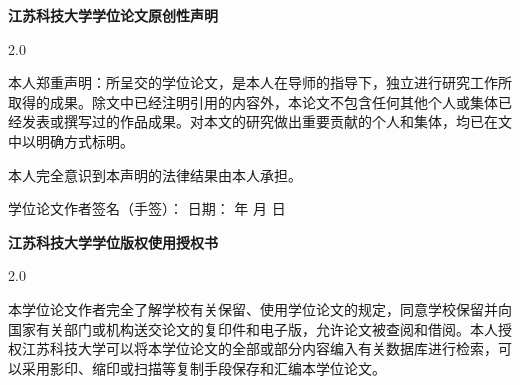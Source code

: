 {
    \vspace*{-2cm}
    \setlength{\parindent}{2em} %
    \vspace*{2cm}
    {
        {\centering \songti {} \bfseries 江苏科技大学学位论文原创性声明\par}    %
        \vspace{21pt}
        \begin{spacing}{2.0}
        {\songti {}本人郑重声明：所呈交的学位论文，是本人在导师的指导下，独立进行研究工作所取得的成果。除文中已经注明引用的内容外，本论文不包含任何其他个人或集体已经发表或撰写过的作品成果。对本文的研究做出重要贡献的个人和集体，均已在文中以明确方式标明。
		
		本人完全意识到本声明的法律结果由本人承担。}
        \end{spacing}
		
        \vspace{10pt}
        \vspace{10pt}
		\vspace{10pt}
        \vspace{10pt}
        \vspace{10pt}
		\vspace{10pt}
		\vspace{10pt}
        \vspace{10pt}
		\vspace{10pt}
        \begin{center}
            {\songti {}学位论文作者签名（手签）：\makebox[5em][c]{} \quad %
            日期：
            \makebox[3em][c]{} 年
            \makebox[1.5em][c]{} 月
            \makebox[1.5em][c]{} 日}
        \end{center}
    }
	
	
	\newpage
    \vspace{2.0cm}
    {
        {\centering \songti {} \bfseries 江苏科技大学学位版权使用授权书 \par}
        \vspace{21pt}
        \begin{spacing}{2.0}
        { \songti {}本学位论文作者完全了解学校有关保留、使用学位论文的规定，同意学校保留并向国家有关部门或机构送交论文的复印件和电子版，允许论文被查阅和借阅。本人授权江苏科技大学可以将本学位论文的全部或部分内容编入有关数据库进行检索，可以采用影印、缩印或扫描等复制手段保存和汇编本学位论文。
		
}
\end{spacing}}}
